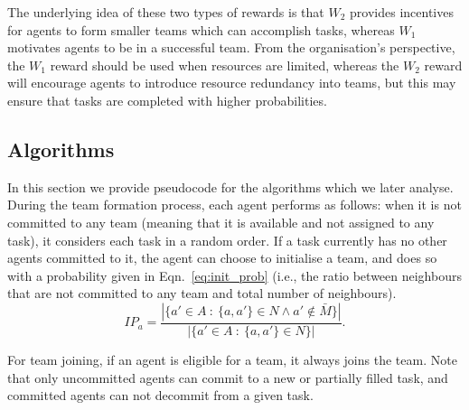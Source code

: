 \documentclass{llncs}
\begin{document}
The underlying idea of these two types of rewards is that $W_2$ provides
incentives for agents to form smaller teams which can accomplish tasks, whereas $W_1$
motivates agents to be in a successful team. From the organisation's perspective, the $W_1$ reward
should be used when resources are limited, whereas the $W_2$ reward will encourage agents to introduce
resource redundancy into teams, but this may ensure that tasks are completed with higher
probabilities.
\vspace{-10pt}
\subsection{Algorithms}
\vspace{-5pt}
In this section we provide pseudocode for the algorithms which we later analyse. During the team formation process, each agent performs as follows:
when it is not committed to any team (meaning that it is available and not assigned to any task), it considers each task in a random order. If a task currently
has no other agents committed to it, the agent can choose to initialise a team, and does so with a probability given in Eqn.~\eqref{eq:init_prob} (i.e.,
the ratio between neighbours that are not committed to any team and total number of neighbours).
\vspace{-5pt}
\begin{equation}
IP_a = \frac{|\{ a' \in A\ :\ \{a, a'\} \in N \wedge a' \notin \bar{M}  \}|}{|\{ a' \in A\ :\ \{a, a'\} \in N \}|}.
\label{eq:init_prob}
\end{equation}

For team joining, if an agent is eligible for a team, it always joins the team. Note that only uncommitted agents can commit to
a new or partially filled task, and committed agents can not decommit from a given task.
%
\end{document}

